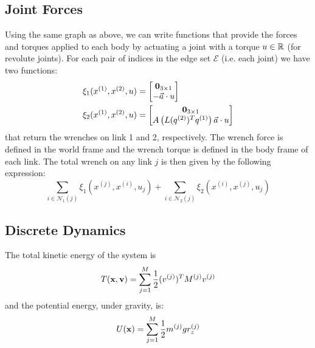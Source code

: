 \documentclass[conference]{IEEEtran}
\begin{document}
\subsection{Joint Forces}
Using the same graph as above, we can write functions that provide the forces and torques 
applied to each body by actuating a joint with a torque $u \in \mathbb{R}$ (for revolute joints). 
For each pair of indices in the edge set $\mathcal{E}$ (i.e. each joint) we have two 
functions: 
\begin{subequations}
    \begin{align}
    \xi_1(x^{(1)}, x^{(2)}, u) &= \begin{bmatrix}
        \mathbf{0}_{3 \times 1} \\ -\vec{a} \cdot u
    \end{bmatrix} \\
    \xi_2(x^{(1)}, x^{(2)}, u) &= \begin{bmatrix}
        \mathbf{0}_{3 \times 1} \\
        A\left(L(q^{(2)})^T q^{(1)}\right) \vec{a} \cdot u
    \end{bmatrix}
    \end{align} 
\end{subequations}
that return the wrenches on link 1 and 2, respectively. The wrench force is defined in the 
world frame and the wrench torque is defined in the body frame of each link.
The total wrench on any link $j$ is then given by the following expression:
\begin{equation} \label{eq:link_wrench}
    \sum_{i \in \mathcal{N}_1(j)} \xi_1\left(x^{(j)}, x^{(i)}, u_j\right) + 
    \sum_{i \in \mathcal{N}_2(j)} \xi_2\left(x^{(i)}, x^{(j)}, u_j\right)
\end{equation}

\subsection{Discrete Dynamics}

The total kinetic energy of the system is 
\begin{equation}
    T(\mathbf{x},\mathbf{v}) = \sum_{j=1}^M \frac{1}{2} (v^{(j)})^T M^{(j)} v^{(j)}
\end{equation}
and the potential energy, under gravity, is:
\begin{equation}
    U(\mathbf{x}) = \sum_{j=1}^M \frac{1}{2} m^{(j)} g r_z^{(j)}
\end{equation}
\end{document}
